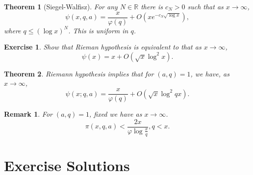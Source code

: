 \documentclass{article}
\newtheorem{theorem}{Theorem} [section]
\newtheorem{remark}{Remark}[section]
\newtheorem{exercise}{Exercise}[section]
\newcommand{\R}[0]{\mathbb{R}}
\begin{document}
\begin{theorem}[Siegel-Walfisz]
  For any $N\in\R$ there is $c_N>0$ such that as $x\to\infty$,
  \begin{equation*}
    \psi(x,q,a) = {\frac x {\varphi(q)}}+O(xe^{-c_N\sqrt{\log x}}),
  \end{equation*}
  where $q\leq (\log x)^N$. This is uniform in $q$. 
\end{theorem}
\begin{exercise}
  Show that Rieman hypothesis is equivalent to that as $x\to\infty$,
  \begin{equation*}
    \psi(x) = x+O(\sqrt{x}\log^2x).
  \end{equation*}
\end{exercise}
\begin{theorem}
  Riemann hypothesis implies that for $(a,q) = 1$, we have, as $x\to\infty$,
  \begin{equation*}
    \psi(x;q,a) = {\frac x {\varphi(q)}}+O(\sqrt{x}\log^2qx).
  \end{equation*}
\end{theorem}
\begin{remark}For $(a,q)=1$, fixed we have as $x\to\infty$.
  \begin{equation*}
    \pi(x,q,a)<{\frac {2x} {\varphi\log {\frac x q}}},q<x.
  \end{equation*}
\end{remark}
\section{Exercise Solutions}
\end{document}

